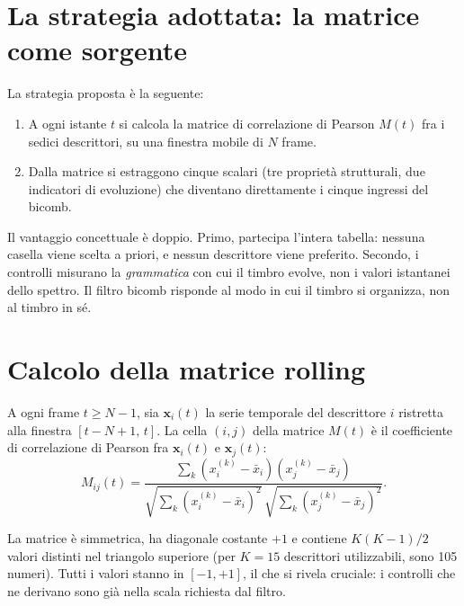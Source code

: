 \documentclass[a4paper,11pt]{article}
\begin{document}
\section{La strategia adottata: la matrice come sorgente}

La strategia proposta è la seguente:

\begin{enumerate}
  \item A ogni istante $t$ si calcola la matrice di correlazione di
        Pearson $M(t)$ fra i sedici descrittori, su una finestra mobile
        di $N$ frame.
  \item Dalla matrice si estraggono cinque scalari (tre proprietà
        strutturali, due indicatori di evoluzione) che diventano
        direttamente i cinque ingressi del bicomb.
\end{enumerate}

Il vantaggio concettuale è doppio. Primo, partecipa l'intera tabella:
nessuna casella viene scelta a priori, e nessun descrittore viene
preferito. Secondo, i controlli misurano la \emph{grammatica} con cui il
timbro evolve, non i valori istantanei dello spettro. Il filtro bicomb
risponde al modo in cui il timbro si organizza, non al timbro in sé.

\section{Calcolo della matrice rolling}

A ogni frame $t \ge N - 1$, sia $\mathbf{x}_i(t)$ la serie temporale del
descrittore $i$ ristretta alla finestra $[t - N + 1,\, t]$. La cella
$(i, j)$ della matrice $M(t)$ è il coefficiente di correlazione di
Pearson fra $\mathbf{x}_i(t)$ e $\mathbf{x}_j(t)$:
\[
M_{ij}(t) = \frac{\sum_{k} (x_i^{(k)} - \bar x_i)(x_j^{(k)} - \bar x_j)}
                 {\sqrt{\sum_{k} (x_i^{(k)} - \bar x_i)^2}\,
                  \sqrt{\sum_{k} (x_j^{(k)} - \bar x_j)^2}}.
\]

La matrice è simmetrica, ha diagonale costante $+1$ e contiene
$K(K-1)/2$ valori distinti nel triangolo superiore (per $K = 15$
descrittori utilizzabili, sono 105 numeri). Tutti i valori stanno in
$[-1, +1]$, il che si rivela cruciale: i controlli che ne derivano sono
già nella scala richiesta dal filtro.
\end{document}
